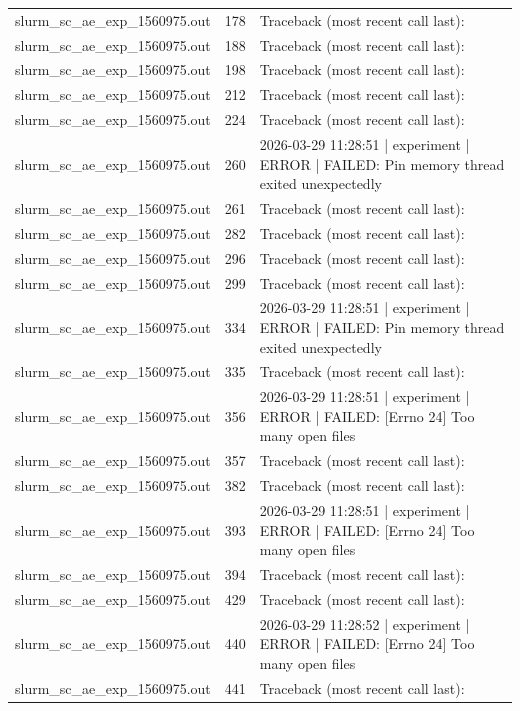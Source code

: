 \begin{tabular}{lrl}
slurm\_sc\_ae\_exp\_1560975.out & 178 & Traceback (most recent call last): \\
slurm\_sc\_ae\_exp\_1560975.out & 188 & Traceback (most recent call last): \\
slurm\_sc\_ae\_exp\_1560975.out & 198 & Traceback (most recent call last): \\
slurm\_sc\_ae\_exp\_1560975.out & 212 & Traceback (most recent call last): \\
slurm\_sc\_ae\_exp\_1560975.out & 224 & Traceback (most recent call last): \\
slurm\_sc\_ae\_exp\_1560975.out & 260 & 2026-03-29 11:28:51 | experiment | ERROR |   FAILED: Pin memory thread exited unexpectedly \\
slurm\_sc\_ae\_exp\_1560975.out & 261 & Traceback (most recent call last): \\
slurm\_sc\_ae\_exp\_1560975.out & 282 & Traceback (most recent call last): \\
slurm\_sc\_ae\_exp\_1560975.out & 296 & Traceback (most recent call last): \\
slurm\_sc\_ae\_exp\_1560975.out & 299 & Traceback (most recent call last): \\
slurm\_sc\_ae\_exp\_1560975.out & 334 & 2026-03-29 11:28:51 | experiment | ERROR |   FAILED: Pin memory thread exited unexpectedly \\
slurm\_sc\_ae\_exp\_1560975.out & 335 & Traceback (most recent call last): \\
slurm\_sc\_ae\_exp\_1560975.out & 356 & 2026-03-29 11:28:51 | experiment | ERROR |   FAILED: [Errno 24] Too many open files \\
slurm\_sc\_ae\_exp\_1560975.out & 357 & Traceback (most recent call last): \\
slurm\_sc\_ae\_exp\_1560975.out & 382 & Traceback (most recent call last): \\
slurm\_sc\_ae\_exp\_1560975.out & 393 & 2026-03-29 11:28:51 | experiment | ERROR |   FAILED: [Errno 24] Too many open files \\
slurm\_sc\_ae\_exp\_1560975.out & 394 & Traceback (most recent call last): \\
slurm\_sc\_ae\_exp\_1560975.out & 429 & Traceback (most recent call last): \\
slurm\_sc\_ae\_exp\_1560975.out & 440 & 2026-03-29 11:28:52 | experiment | ERROR |   FAILED: [Errno 24] Too many open files \\
slurm\_sc\_ae\_exp\_1560975.out & 441 & Traceback (most recent call last): \\

\end{tabular}
